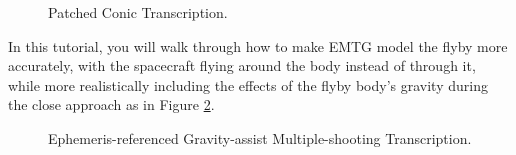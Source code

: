 \documentclass[11pt]{article}
\begin{document}
\begin{figure}[H]
	\centering
	\caption{\label{fig:patched_conic_transcription}Patched Conic Transcription.}
\end{figure}

\noindent In this tutorial, you will walk through how to make \ac{EMTG} model the flyby more accurately, with the spacecraft flying around the body instead of through it, while more realistically including the effects of the flyby body’s gravity during the close approach as in Figure \ref{fig:non_zsoi_transcription}.

\begin{figure}
	\centering
	\caption{\label{fig:non_zsoi_transcription}Ephemeris-referenced Gravity-assist Multiple-shooting Transcription.}
\end{figure}
\end{document}
